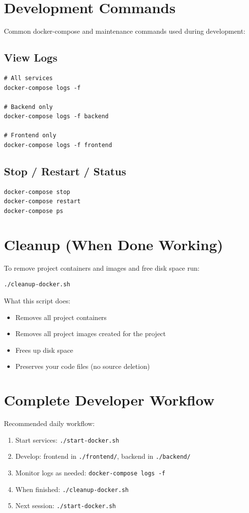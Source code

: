 \documentclass[11pt]{article}
\begin{document}
\section{Development Commands}
Common docker-compose and maintenance commands used during development:
\subsection*{View Logs}
\begin{Verbatim}[fontsize=\small]
# All services
docker-compose logs -f

# Backend only
docker-compose logs -f backend

# Frontend only
docker-compose logs -f frontend
\end{Verbatim}

\subsection*{Stop / Restart / Status}
\begin{Verbatim}[fontsize=\small]
docker-compose stop
docker-compose restart
docker-compose ps
\end{Verbatim}

\section{Cleanup (When Done Working)}
To remove project containers and images and free disk space run:
\begin{Verbatim}[fontsize=\small]
./cleanup-docker.sh
\end{Verbatim}

What this script does:
\begin{itemize}
	\item Removes all project containers
	\item Removes all project images created for the project
	\item Frees up disk space
	\item Preserves your code files (no source deletion)
\end{itemize}

\section{Complete Developer Workflow}
Recommended daily workflow:
\begin{enumerate}
	\item Start services: \texttt{./start-docker.sh}
	\item Develop: frontend in \texttt{./frontend/}, backend in \texttt{./backend/}
	\item Monitor logs as needed: \texttt{docker-compose logs -f}
	\item When finished: \texttt{./cleanup-docker.sh}
	\item Next session: \texttt{./start-docker.sh}
\end{enumerate}
\end{document}
